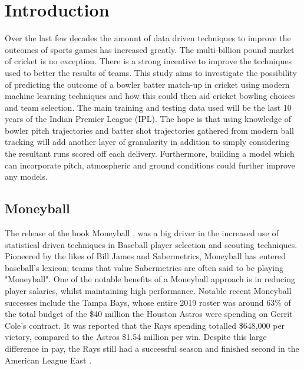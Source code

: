 \documentclass[12pt,a4paper]{report}
\theoremstyle{definition}
\begin{document}
\newpage
\setcounter{page}{1}

\chapter{Introduction}

Over the last few decades the amount of data driven techniques to improve the outcomes of sports games has increased greatly. 
The multi-billion pound market of cricket is no exception. 
There is a strong incentive to improve the techniques used to better the results of teams. 
This study aims to investigate the possibility of predicting the outcome of a bowler batter match-up in cricket using modern machine learning techniques and how this could then aid cricket bowling choices and team selection. 
The main training and testing data used will be the last 10 years of the Indian Premier League (IPL).
The hope is that using knowledge of bowler pitch trajectories and batter shot trajectories gathered from modern ball tracking will add another layer of granularity in addition to simply considering the resultant runs scored off each delivery. 
Furthermore, building a model which can incorporate pitch, atmospheric and ground conditions could further improve any models. 

\section{Moneyball}

The release of the book Moneyball \citep{Moneyball2004}, was a big driver in the increased use of statistical driven techniques in Baseball player selection and scouting techniques. 
Pioneered by the likes of Bill James and Sabermetrics, Moneyball has entered baseball's lexicon; teams that value Sabermetrics are often said to be playing "Moneyball".  
One of the notable benefits of a Moneyball approach is in reducing player salaries, whilst maintaining high performance. 
Notable recent Moneyball successes include the Tampa Bays, whose entire 2019 roster was around 63\% of the total budget of the \$40 million the Houston Astros were spending on Gerrit Cole's contract. 
It was reported that the Rays spending totalled \$648,000 per victory, compared to the Astros \$1.54 million per win.
Despite this large difference in pay, the Rays still had a successful season and finished second in the American League East \citep{Fox2019}.
\end{document}
